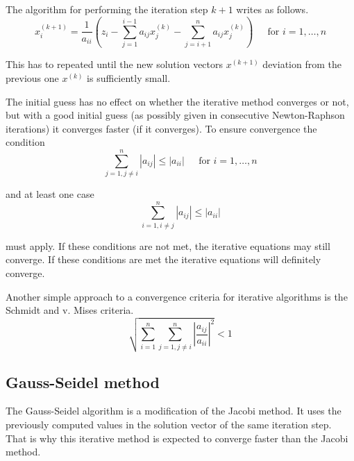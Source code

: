 \addvspace{12pt}

The algorithm for performing the iteration step $k + 1$ writes as
follows.
\begin{equation}
x_{i}^{(k+1)} = \dfrac{1}{a_{ii}}\left(z_i - \sum_{j=1}^{i-1} a_{ij}x_{j}^{(k)} - \sum_{j=i+1}^{n} a_{ij}x_{j}^{(k)}\right)
\;\;\;\; \textrm{ for } i = 1, \ldots, n
\end{equation}

This has to repeated until the new solution vectors $x^{(k+1)}$
deviation from the previous one $x^{(k)}$ is sufficiently small.

\addvspace{12pt}

The initial guess has no effect on whether the iterative method
converges or not, but with a good initial guess (as possibly given in
consecutive Newton-Raphson iterations) it converges faster (if it
converges).  To ensure convergence the condition
\begin{equation}
\sum_{j = 1, j \ne i}^{n} \left|a_{ij}\right| \le \left|a_{ii}\right|
\;\;\;\; \textrm{ for } i = 1, \ldots, n
\end{equation}

and at least one case
\begin{equation}
\sum_{i = 1, i \ne j}^{n} \left|a_{ij}\right| \le \left|a_{ii}\right|
\end{equation}

must apply.  If these conditions are not met, the iterative equations
may still converge.  If these conditions are met the iterative
equations will definitely converge.

\addvspace{12pt}

Another simple approach to a convergence criteria for iterative
algorithms is the Schmidt and v. Mises criteria.
\begin{equation}
\sqrt{\sum_{i = 1}^n \sum_{j = 1, j \ne i}^n \left|\dfrac{a_{ij}}{a_{ii}}\right|^2} < 1
\end{equation}

\subsection{Gauss-Seidel method}

The Gauss-Seidel algorithm is a modification of the Jacobi method.  It
uses the previously computed values in the solution vector of the same
iteration step.  That is why this iterative method is expected to
converge faster than the Jacobi method.

